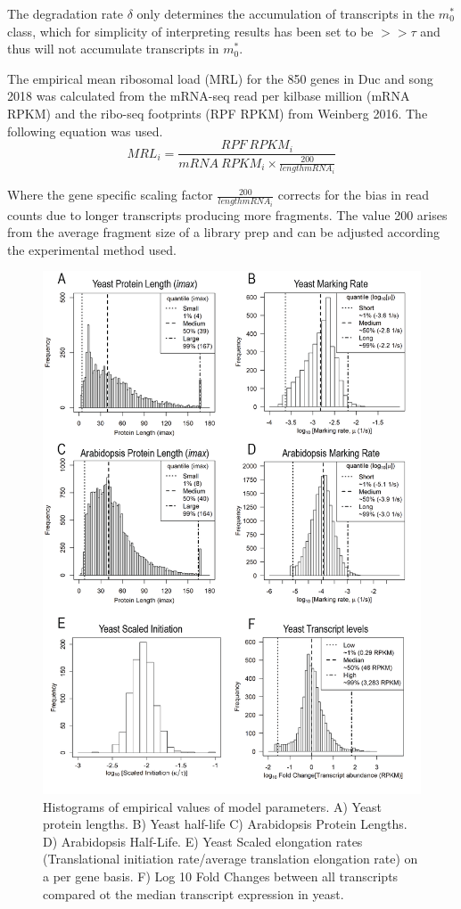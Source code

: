 \documentclass[review]{elsarticle}
\begin{document}
The degradation rate $\delta$ only determines the accumulation of transcripts in the  $m_0^*$  class, which for simplicity of interpreting results has been set to be $>>\tau$ and thus will not accumulate transcripts in $m_0^*$.
 
The empirical mean ribosomal load (MRL) for the 850 genes in Duc and song 2018 was calculated from the mRNA-seq read per kilbase million (mRNA RPKM) and the ribo-seq footprints (RPF RPKM) from Weinberg 2016. The following equation was used.
\begin{equation}
	MRL_i = \frac{RPF\: RPKM_i}{mRNA\: RPKM_i \times \frac{200}{length mRNA_i}}
\end{equation}

Where the gene specific scaling factor $\frac{200}{length mRNA_i}$ corrects for the bias in read counts due to longer transcripts producing more fragments. The value 200 arises from the average fragment size of a library prep and can be adjusted according the experimental method used.

\begin{figure}[!ht]
\centering
\includegraphics[width=120mm]{Images/2023-07-04_parameter_histograms.png}
\caption{Histograms of empirical values of model parameters. A) Yeast protein lengths. B) Yeast half-life C) Arabidopsis Protein Lengths. D) Arabidopsis Half-Life. E) Yeast Scaled elongation rates (Translational initiation rate/average translation elongation rate) on a per gene basis. F) Log 10 Fold Changes between all transcripts compared ot the median transcript expression in yeast. }
\end{figure}
\clearpage		
\end{document}
